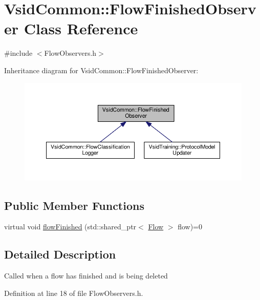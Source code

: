 \hypertarget{class_vsid_common_1_1_flow_finished_observer}{\section{Vsid\-Common\-:\-:Flow\-Finished\-Observer Class Reference}
\label{class_vsid_common_1_1_flow_finished_observer}
}


{\ttfamily \#include $<$Flow\-Observers.\-h$>$}



Inheritance diagram for Vsid\-Common\-:\-:Flow\-Finished\-Observer\-:
\nopagebreak
\begin{figure}[H]
\begin{center}
\leavevmode
\includegraphics[width=350pt]{class_vsid_common_1_1_flow_finished_observer__inherit__graph}
\end{center}
\end{figure}
\subsection*{Public Member Functions}
\begin{DoxyCompactItemize}
\item 
virtual void \hyperlink{class_vsid_common_1_1_flow_finished_observer_a522fcd1ab5474eca5bc3f7419b3c45a5}{flow\-Finished} (std\-::shared\-\_\-ptr$<$ \hyperlink{class_vsid_common_1_1_flow}{Flow} $>$ flow)=0
\end{DoxyCompactItemize}


\subsection{Detailed Description}
Called when a flow has finished and is being deleted 

Definition at line 18 of file Flow\-Observers.\-h.



